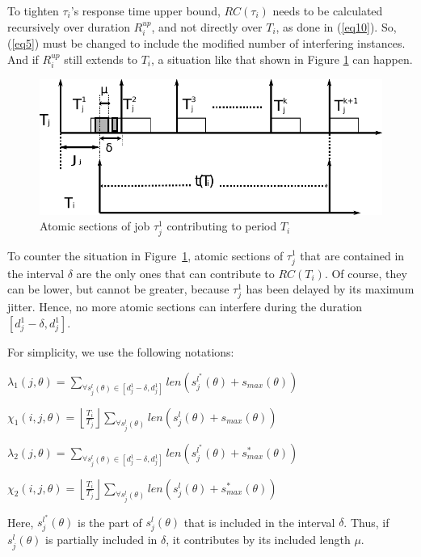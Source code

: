 \documentclass[letter]{sig-alternate}
\begin{document}
To tighten $\tau_{i}$'s response time upper bound, $RC(\tau_i)$ needs to be calculated recursively over duration $R_i^{up}$, 
and not directly over $T_i$, as done in (\ref{eq10}). So, (\ref{eq5}) must be changed to include the modified number of interfering instances. And if $R_i^{up}$ still extends to $T_i$, a situation like that shown in Figure
\ref{fig10} can happen.
\begin{figure}
\centering{}\includegraphics[scale=0.5]{figures/figure10}\caption{\label{fig10} Atomic sections of job $\tau_{j}^{1}$ contributing to period $T_i$}
\end{figure}


To counter the situation in Figure~\ref{fig10}, atomic sections of $\tau_{j}^{1}$ that are contained in the interval $\delta$
are the only ones that can contribute to $RC(T_{i})$. Of course, they can be lower, but cannot be greater, because $\tau_{j}^{1}$ has been delayed by its maximum jitter. Hence, no more atomic sections
can interfere during the duration 
$[d_j^1 -\delta,d_j^1]$.

For simplicity, we use the following notations:
\begin{compactitem}
\item $\lambda_{1}\left(j,\theta\right)=\sum_{\forall s_{j}^{l}\left(\theta\right)\in\left[d_j^1-\delta,d_j^1\right]}len\left(s_{j}^{l^{*}}\left(\theta\right)+s_{max}\left(\theta\right)\right)$
\item $\chi_{1}\left(i,j,\theta\right)=\left\lfloor\frac{T_{i}}{T_{j}}\right\rfloor\sum_{\forall s_{j}^{l}\left(\theta\right)}len\left(s_{j}^{l}\left(\theta\right)+s_{max}\left(\theta\right)\right)$
\item $\lambda_{2}\left(j,\theta\right)=\sum_{\forall s_{j}^{l}\left(\theta\right)\in\left[d_{j}^{1}-\delta,d_{j}^{1}\right]}len\left(s_{j}^{l^{*}}\left(\theta\right)+s_{max}^{*}\left(\theta\right)\right)$
\item $\chi_{2}\left(i,j,\theta\right)=\left\lfloor\frac{T_{i}}{T_{j}}\right\rfloor\sum_{\forall s_{j}^{l}\left(\theta\right)}len\left(s_{j}^{l}\left(\theta\right)+s_{max}^{*}\left(\theta\right)\right)$
\end{compactitem}
Here, $s_{j}^{l^{*}}\left(\theta\right)$ is the part of $s_{j}^{l}\left(\theta\right)$ that
is included in the interval $\delta$. Thus, if $s_j^l (\theta)$ is partially included in $\delta$, it contributes by its included length $\mu$.
\end{document}

